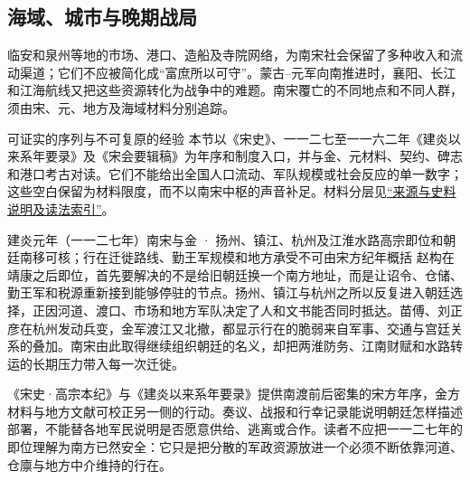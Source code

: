 \subsection{海域、城市与晚期战局}
临安和泉州等地的市场、港口、造船及寺院网络，为南宋社会保留了多种收入和流动渠道；它们不应被简化成“富庶所以可守”。蒙古--元军向南推进时，襄阳、长江和江海航线又把这些资源转化为战争中的难题。南宋覆亡的不同地点和不同人群，须由宋、元、地方及海域材料分别追踪。

\begin{sourcenote}{可证实的序列与不可复原的经验}
本节以《宋史》、一一二七至一一六二年《建炎以来系年要录》及《宋会要辑稿》为年序和制度入口，并与金、元材料、契约、碑志和港口考古对读。它们不能给出全国人口流动、军队规模或社会反应的单一数字；这些空白保留为材料限度，而不以南宋中枢的声音补足。材料分层见\hyperref[app:sources]{“来源与史料说明及读法索引”}。
\end{sourcenote}

\begin{event}{}{建炎元年（一一二七年）}{南宋与金 · 扬州、镇江、杭州及江淮水路}{高宗即位和朝廷南移可核；行在迁徙路线、勤王军规模和地方承受不可由宋方纪年概括}
赵构在靖康之后即位，首先要解决的不是给旧朝廷换一个南方地址，而是让诏令、仓储、勤王军和税源重新接到能够停驻的节点。扬州、镇江与杭州之所以反复进入朝廷选择，正因河道、渡口、市场和地方军队决定了人和文书能否同时抵达。苗傅、刘正彦在杭州发动兵变，金军渡江又北撤，都显示行在的脆弱来自军事、交通与宫廷关系的叠加。南宋由此取得继续组织朝廷的名义，却把两淮防务、江南财赋和水路转运的长期压力带入每一次迁徙。

《宋史·高宗本纪》与《建炎以来系年要录》提供南渡前后密集的宋方年序，金方材料与地方文献可校正另一侧的行动。奏议、战报和行幸记录能说明朝廷怎样描述部署，不能替各地军民说明是否愿意供给、逃离或合作。读者不应把一一二七年的即位理解为南方已然安全：它只是把分散的军政资源放进一个必须不断依靠河道、仓廪与地方中介维持的行在。
\end{event}
